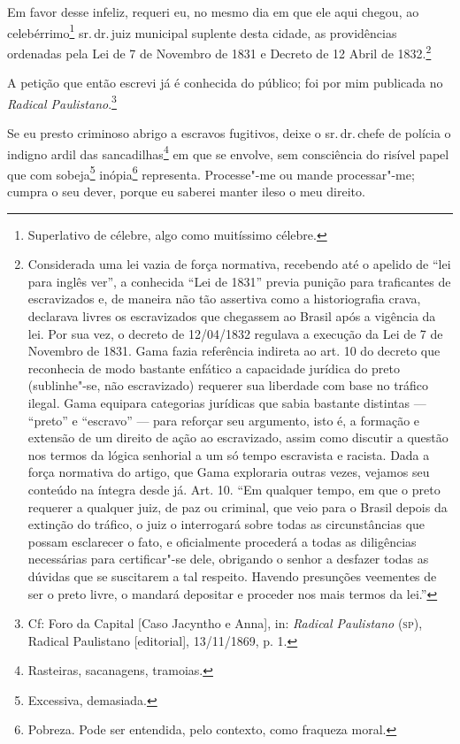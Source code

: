 Em favor desse infeliz, requeri eu, no mesmo dia em que ele aqui chegou,
ao celebérrimo\footnote{Superlativo de célebre, algo como muitíssimo \label{celebre}
  célebre.} sr.\,dr.\,juiz municipal suplente desta cidade, as
providências ordenadas pela Lei de 7 de Novembro de 1831 e Decreto de 12
Abril de 1832.\footnote{Considerada uma lei vazia de força normativa,
  recebendo até o apelido de ``lei para inglês ver'', a conhecida ``Lei de
  1831'' previa punição para traficantes de escravizados e, de maneira
  não tão assertiva como a historiografia crava, declarava livres os
  escravizados que chegassem ao Brasil após a vigência da lei. Por sua
  vez, o decreto de 12/04/1832 regulava a execução da Lei de 7 de
  Novembro de 1831. Gama fazia referência indireta ao art.
  10 do decreto que reconhecia de modo bastante enfático a capacidade
  jurídica do preto (sublinhe"-se, não escravizado) requerer sua
  liberdade com base no tráfico ilegal. Gama equipara categorias
  jurídicas que sabia bastante distintas --- ``preto'' e ``escravo'' --- para
  reforçar seu argumento, isto é, a formação e extensão de um direito de
  ação ao escravizado, assim como discutir a questão nos termos da
  lógica senhorial a um só tempo escravista e racista. Dada a força
  normativa do artigo, que Gama exploraria outras vezes, vejamos seu conteúdo na
  íntegra desde já. Art. 10. ``Em qualquer tempo, em que o preto requerer
  a qualquer juiz, de paz ou criminal, que veio para o Brasil depois da
  extinção do tráfico, o juiz o interrogará sobre todas as
  circunstâncias que possam esclarecer o fato, e oficialmente procederá
  a todas as diligências necessárias para certificar"-se dele, obrigando
  o senhor a desfazer todas as dúvidas que se suscitarem a tal respeito.
  Havendo presunções veementes de ser o preto livre, o mandará depositar
  e proceder nos mais termos da lei.''}

A petição que então escrevi já é conhecida do público; foi por mim
publicada no \emph{Radical Paulistano}.\footnote{Cf: Foro da Capital
  {[}Caso Jacyntho e Anna{]}, in: \emph{Radical Paulistano} (\textsc{sp}),
  Radical Paulistano {[}editorial{]}, 13/11/1869, p. 1.}


Se eu presto criminoso abrigo a escravos fugitivos, deixe o sr.\,dr.\,chefe de polícia o indigno ardil das sancadilhas\footnote{Rasteiras,
  sacanagens, tramoias.} em que se envolve, sem consciência do risível
papel que com sobeja\footnote{Excessiva, demasiada.} inópia\footnote{
  Pobreza. Pode ser entendida, pelo contexto, como fraqueza moral.}
representa. Processe"-me ou mande processar"-me; cumpra o seu dever,
porque eu saberei manter ileso o meu direito.

